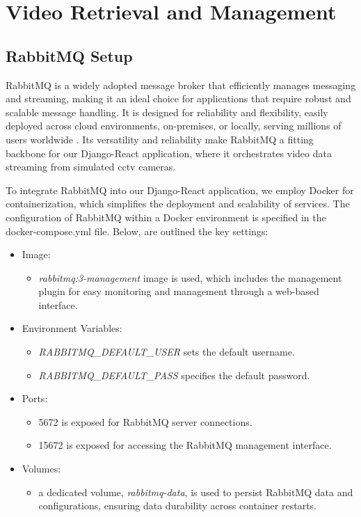 \section{Video Retrieval and Management}
\subsection{RabbitMQ Setup}
RabbitMQ is a widely adopted message broker that efficiently manages messaging and streaming, making it an ideal 
choice for applications that require robust and scalable message handling. It is 
designed for reliability and flexibility, easily deployed across cloud environments, on-premises, or locally, serving 
millions of users worldwide \cite{rfc48}. Its versatility and reliability make RabbitMQ a fitting backbone for our Django-React 
application, where it orchestrates video data streaming from simulated \ac{cctv} cameras.

To integrate RabbitMQ into our Django-React application, we employ Docker for containerization, which simplifies the 
deployment and scalability of services. The configuration of RabbitMQ within a Docker environment is specified in the 
docker-compose.yml file. Below, are outlined the key settings:
\begin{itemize}
    \item Image: 
        \begin{itemize}
            \item \textit{rabbitmq:3-management} image is used, which includes the management plugin for easy monitoring and management through a web-based interface.
        \end{itemize}
    \item Environment Variables:
        \begin{itemize}
            \item \textit{RABBITMQ\_DEFAULT\_USER} sets the default username.
            \item \textit{RABBITMQ\_DEFAULT\_PASS} specifies the default password.
        \end{itemize}
    \item Ports:
        \begin{itemize}
            \item 5672 is exposed for RabbitMQ server connections.
            \item 15672 is exposed for accessing the RabbitMQ management interface.
        \end{itemize}
    \item Volumes:
        \begin{itemize}
            \item a dedicated volume, \textit{rabbitmq-data}, is used to persist RabbitMQ data and configurations, ensuring data durability across container restarts.
        \end{itemize}
\end{itemize}



